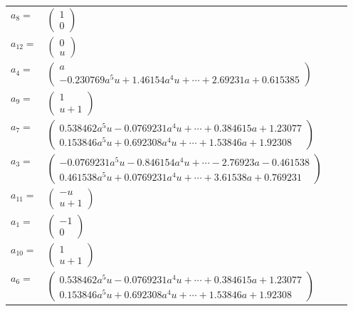 \documentclass[1p]{elsarticle_modified}
\theoremstyle{definition}
\begin{document}
\begin{tabular}{m{7pt} m{180pt} m{7pt} m{180pt} }
\flushright $a_{8}=$&$\begin{pmatrix}1\\0\end{pmatrix}$ \\
\flushright $a_{12}=$&$\begin{pmatrix}0\\u\end{pmatrix}$ \\
\flushright $a_{4}=$&$\begin{pmatrix}a\\-0.230769 a^{5} u+1.46154 a^{4} u+\cdots+2.69231 a+0.615385\end{pmatrix}$ \\
\flushright $a_{9}=$&$\begin{pmatrix}1\\u+1\end{pmatrix}$ \\
\flushright $a_{7}=$&$\begin{pmatrix}0.538462 a^{5} u-0.0769231 a^{4} u+\cdots+0.384615 a+1.23077\\0.153846 a^{5} u+0.692308 a^{4} u+\cdots+1.53846 a+1.92308\end{pmatrix}$ \\
\flushright $a_{3}=$&$\begin{pmatrix}-0.0769231 a^{5} u-0.846154 a^{4} u+\cdots-2.76923 a-0.461538\\0.461538 a^{5} u+0.0769231 a^{4} u+\cdots+3.61538 a+0.769231\end{pmatrix}$ \\
\flushright $a_{11}=$&$\begin{pmatrix}- u\\u+1\end{pmatrix}$ \\
\flushright $a_{1}=$&$\begin{pmatrix}-1\\0\end{pmatrix}$ \\
\flushright $a_{10}=$&$\begin{pmatrix}1\\u+1\end{pmatrix}$ \\
\flushright $a_{6}=$&$\begin{pmatrix}0.538462 a^{5} u-0.0769231 a^{4} u+\cdots+0.384615 a+1.23077\\0.153846 a^{5} u+0.692308 a^{4} u+\cdots+1.53846 a+1.92308\end{pmatrix}$ \\

\end{tabular}
\end{document}
